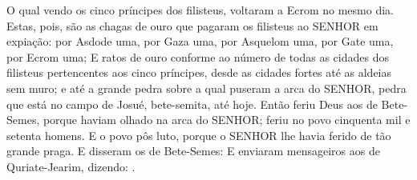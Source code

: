 {  O qual vendo os cinco príncipes dos filisteus, voltaram a Ecrom no mesmo dia. %
  Estas, pois, são as chagas de ouro que pagaram os filisteus ao SENHOR em expiação: por Asdode uma, por Gaza uma, por Asquelom uma, por Gate uma, por Ecrom uma;
  E ratos de ouro conforme ao número de todas as cidades dos filisteus pertencentes aos cinco príncipes, desde as cidades fortes até as aldeias sem muro; e até a grande pedra sobre a qual puseram a arca do SENHOR, pedra que está no campo de Josué, bete-semita, até hoje.
  Então feriu Deus aos de Bete-Semes, porque haviam olhado na arca do SENHOR; feriu no povo cinquenta mil e setenta homens. E o povo pôs luto, porque o SENHOR lhe havia ferido de tão grande praga. %
  E disseram os de Bete-Semes: 
  E enviaram mensageiros aos de Quriate-Jearim, dizendo: .
\par }

